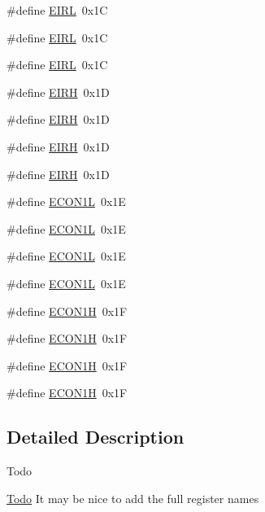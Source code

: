 \begin{DoxyCompactItemize}
\item 
\#define \mbox{\hyperlink{group___b_a_n_k__0_ga2bbf74cf1cb5367d111476ffd5fcdd33}{E\+I\+RL}}~0x1C
\item 
\#define \mbox{\hyperlink{group___b_a_n_k__0_ga2bbf74cf1cb5367d111476ffd5fcdd33}{E\+I\+RL}}~0x1C
\item 
\#define \mbox{\hyperlink{group___b_a_n_k__0_ga2bbf74cf1cb5367d111476ffd5fcdd33}{E\+I\+RL}}~0x1C
\item 
\#define \mbox{\hyperlink{group___b_a_n_k__0_ga93ae3cd8715af8b617af2a957b117dbc}{E\+I\+RH}}~0x1D
\item 
\#define \mbox{\hyperlink{group___b_a_n_k__0_ga93ae3cd8715af8b617af2a957b117dbc}{E\+I\+RH}}~0x1D
\item 
\#define \mbox{\hyperlink{group___b_a_n_k__0_ga93ae3cd8715af8b617af2a957b117dbc}{E\+I\+RH}}~0x1D
\item 
\#define \mbox{\hyperlink{group___b_a_n_k__0_ga93ae3cd8715af8b617af2a957b117dbc}{E\+I\+RH}}~0x1D
\item 
\#define \mbox{\hyperlink{group___b_a_n_k__0_ga86f1c532ca33c5b3310b32ae5065af31}{E\+C\+O\+N1L}}~0x1E
\item 
\#define \mbox{\hyperlink{group___b_a_n_k__0_ga86f1c532ca33c5b3310b32ae5065af31}{E\+C\+O\+N1L}}~0x1E
\item 
\#define \mbox{\hyperlink{group___b_a_n_k__0_ga86f1c532ca33c5b3310b32ae5065af31}{E\+C\+O\+N1L}}~0x1E
\item 
\#define \mbox{\hyperlink{group___b_a_n_k__0_ga86f1c532ca33c5b3310b32ae5065af31}{E\+C\+O\+N1L}}~0x1E
\item 
\#define \mbox{\hyperlink{group___b_a_n_k__0_ga2f5fa37a9f050116da15bf29f34308a1}{E\+C\+O\+N1H}}~0x1F
\item 
\#define \mbox{\hyperlink{group___b_a_n_k__0_ga2f5fa37a9f050116da15bf29f34308a1}{E\+C\+O\+N1H}}~0x1F
\item 
\#define \mbox{\hyperlink{group___b_a_n_k__0_ga2f5fa37a9f050116da15bf29f34308a1}{E\+C\+O\+N1H}}~0x1F
\item 
\#define \mbox{\hyperlink{group___b_a_n_k__0_ga2f5fa37a9f050116da15bf29f34308a1}{E\+C\+O\+N1H}}~0x1F
\end{DoxyCompactItemize}


\subsection{Detailed Description}
\begin{DoxyRefDesc}{Todo}
\item[\mbox{\hyperlink{todo__todo000004}{Todo}}]It may be nice to add the full register names\end{DoxyRefDesc}



